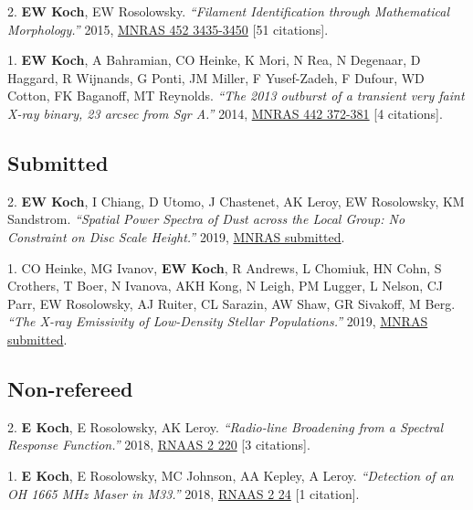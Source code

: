 \documentclass[letterpaper,11pt]{article}
\newenvironment{publist}{
  \begingroup
  \raggedright
  \begin{description}[leftmargin=4ex,style=sameline]
}{
  \end{description}
  \endgroup
}
\begin{document}
\begin{publist}
\item[2.] \textbf{EW Koch}, EW Rosolowsky. \textit{``Filament Identification through Mathematical Morphology.''} 2015, \href{http://adsabs.harvard.edu/abs/2015MNRAS.452.3435K}{MNRAS 452 3435-3450} [51 citations].
\item[1.] \textbf{EW Koch}, A Bahramian, CO Heinke, K Mori, N Rea, N Degenaar, D Haggard, R Wijnands, G Ponti, JM Miller, F Yusef-Zadeh, F Dufour, WD Cotton, FK Baganoff, MT Reynolds. \textit{``The 2013 outburst of a transient very faint X-ray binary, 23 arcsec from Sgr A\textasteriskcentered.''} 2014, \href{http://adsabs.harvard.edu/abs/2014MNRAS.442..372K}{MNRAS 442 372-381} [4 citations].
\end{publist}

\subsection*{Submitted}

\begin{publist}
\item[2.] \textbf{EW Koch}, I Chiang, D Utomo, J Chastenet, AK Leroy, EW Rosolowsky, KM Sandstrom. \textit{``Spatial Power Spectra of Dust across the Local Group: No Constraint on Disc Scale Height.''} 2019, \href{http://adsabs.harvard.edu/abs/None}{MNRAS submitted}.
\item[1.] CO Heinke, MG Ivanov, \textbf{EW Koch}, R Andrews, L Chomiuk, HN Cohn, S Crothers, T Boer, N Ivanova, AKH Kong, N Leigh, PM Lugger, L Nelson, CJ Parr, EW Rosolowsky, AJ Ruiter, CL Sarazin, AW Shaw, GR Sivakoff, M Berg. \textit{``The X-ray Emissivity of Low-Density Stellar Populations.''} 2019, \href{http://adsabs.harvard.edu/abs/None}{MNRAS submitted}.
\end{publist}

\subsection*{Non-refereed}

\begin{publist}
\item[2.] \textbf{E Koch}, E Rosolowsky, AK Leroy. \textit{``Radio-line Broadening from a Spectral Response Function.''} 2018, \href{http://adsabs.harvard.edu/abs/2018RNAAS...2d.220K}{RNAAS 2 220} [3 citations].
\item[1.] \textbf{E Koch}, E Rosolowsky, MC Johnson, AA Kepley, A Leroy. \textit{``Detection of an OH 1665 MHz Maser in M33.''} 2018, \href{http://adsabs.harvard.edu/abs/2018RNAAS...2a..24K}{RNAAS 2 24} [1 citation].
\end{publist}
\end{document}
